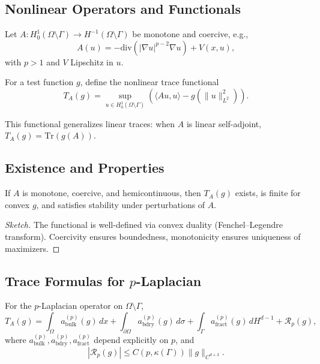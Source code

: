 \subsection{Nonlinear Operators and Functionals}

\begin{definition}
Let $A : H^1_0(\Omega \setminus \Gamma) \to H^{-1}(\Omega \setminus \Gamma)$ be monotone and coercive, e.g.,
\[
A(u) = -\mathrm{div}(|\nabla u|^{p-2}\nabla u) + V(x,u),
\]
with $p>1$ and $V$ Lipschitz in $u$. 
\end{definition}

\begin{definition}
For a test function $g$, define the nonlinear trace functional
\[
T_A(g) = \sup_{u \in H^1_0(\Omega\setminus \Gamma)} \left( \langle Au, u \rangle - g(\|u\|^2_{L^2}) \right).
\]
\end{definition}

\begin{remark}
This functional generalizes linear traces: when $A$ is linear self-adjoint, $T_A(g) = \mathrm{Tr}(g(A))$. 
\end{remark}

\subsection{Existence and Properties}

\begin{theorem}
\label{thm:nonlinear-trace-existence}
If $A$ is monotone, coercive, and hemicontinuous, then $T_A(g)$ exists, is finite for convex $g$, and satisfies stability under perturbations of $A$. 
\end{theorem}

\begin{proof}[Sketch]
The functional is well-defined via convex duality (Fenchel–Legendre transform). 
Coercivity ensures boundedness, monotonicity ensures uniqueness of maximizers. 
\end{proof}

\subsection{Trace Formulas for $p$-Laplacian}

\begin{theorem}
\label{thm:p-lap-trace}
For the $p$-Laplacian operator on $\Omega \setminus \Gamma$,
\[
T_A(g) = \int_\Omega a_{\mathrm{bulk}}^{(p)}(g)\,dx + \int_{\partial \Omega} a_{\mathrm{bdry}}^{(p)}(g)\,d\sigma + \int_\Gamma a_{\mathrm{fract}}^{(p)}(g)\,dH^{d-1} + \mathcal{R}_p(g),
\]
where $a_{\mathrm{bulk}}^{(p)}, a_{\mathrm{bdry}}^{(p)}, a_{\mathrm{fract}}^{(p)}$ depend explicitly on $p$, and
\[
|\mathcal{R}_p(g)| \leq C(p,\kappa(\Gamma)) \|g\|_{C^{d+3}}.
\]
\end{theorem}

